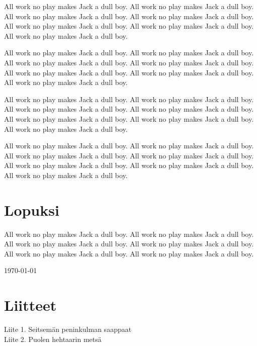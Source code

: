 \documentclass{sfs-2487-2000}
\begin{document}
All work no play makes Jack a dull boy. All work no play makes Jack a dull boy. All work no play makes Jack a dull boy. All work no play makes Jack a dull boy. All work no play makes Jack a dull boy. All work no play makes Jack a dull boy. All work no play makes Jack a dull boy.

All work no play makes Jack a dull boy. All work no play makes Jack a dull boy. All work no play makes Jack a dull boy. All work no play makes Jack a dull boy. All work no play makes Jack a dull boy. All work no play makes Jack a dull boy. All work no play makes Jack a dull boy.

All work no play makes Jack a dull boy. All work no play makes Jack a dull boy. All work no play makes Jack a dull boy. All work no play makes Jack a dull boy. All work no play makes Jack a dull boy. All work no play makes Jack a dull boy. All work no play makes Jack a dull boy.

All work no play makes Jack a dull boy. All work no play makes Jack a dull boy. All work no play makes Jack a dull boy. All work no play makes Jack a dull boy. All work no play makes Jack a dull boy. All work no play makes Jack a dull boy. All work no play makes Jack a dull boy.

\section{Lopuksi}

\align All work no play makes Jack a dull boy. All work no play makes Jack a dull boy. All work no play makes Jack a dull boy. All work no play makes Jack a dull boy. All work no play makes Jack a dull boy. All work no play makes Jack a dull boy.

\signature{Jyväskylässä}{\today}

\vfill

\section{Liitteet}

\align
Liite 1. Seitsemän peninkulman saappaat \\
Liite 2. Puolen hehtaarin metsä

\nopagenum
\end{document}
